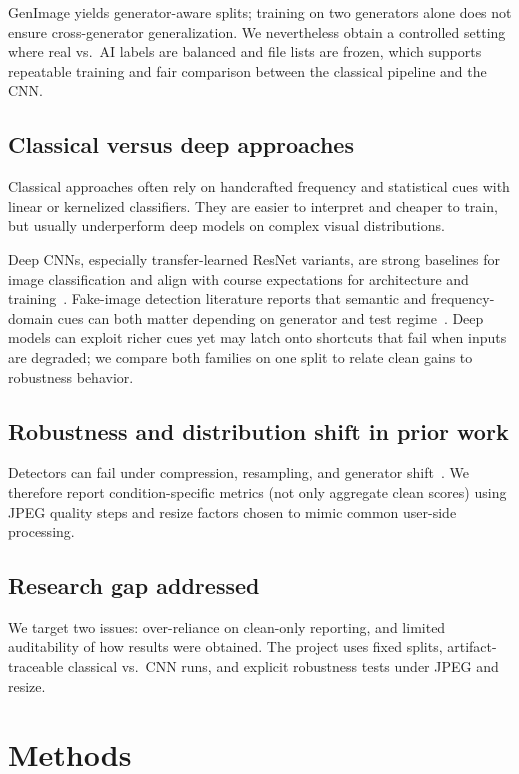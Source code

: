 \documentclass[conference]{IEEEtran}
\begin{document}
GenImage yields generator-aware splits; training on two generators alone does not ensure cross-generator generalization. We nevertheless obtain a controlled setting where real vs.\ AI labels are balanced and file lists are frozen, which supports repeatable training and fair comparison between the classical pipeline and the CNN.

\subsection{Classical versus deep approaches}
Classical approaches often rely on handcrafted frequency and statistical cues with linear or kernelized classifiers. They are easier to interpret and cheaper to train, but usually underperform deep models on complex visual distributions.

Deep CNNs, especially transfer-learned ResNet variants, are strong baselines for image classification and align with course expectations for architecture and training~\cite{he2016resnet,torchvisiondocs}. Fake-image detection literature reports that semantic and frequency-domain cues can both matter depending on generator and test regime~\cite{frank2020leveraging,wang2020cnn}. Deep models can exploit richer cues yet may latch onto shortcuts that fail when inputs are degraded; we compare both families on one split to relate clean gains to robustness behavior.

\subsection{Robustness and distribution shift in prior work}
Detectors can fail under compression, resampling, and generator shift~\cite{wang2020cnn,chai2020makes,ojha2023universal}. We therefore report condition-specific metrics (not only aggregate clean scores) using JPEG quality steps and resize factors chosen to mimic common user-side processing.

\subsection{Research gap addressed}
We target two issues: over-reliance on clean-only reporting, and limited auditability of how results were obtained. The project uses fixed splits, artifact-traceable classical vs.\ CNN runs, and explicit robustness tests under JPEG and resize.

\section{Methods}
\label{sec:methods}
\end{document}
